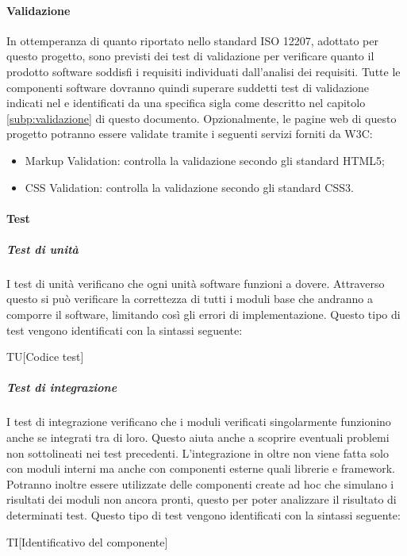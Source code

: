 			\paragraph{Validazione}
			In ottemperanza di quanto riportato nello standard ISO 12207, adottato per questo progetto, sono previsti dei test di validazione per verificare quanto il prodotto software soddisfi i requisiti individuati dall'analisi dei requisiti.
			Tutte le componenti software dovranno quindi superare suddetti test di validazione indicati nel \docNameVersionPdQ e identificati da una specifica sigla come descritto nel capitolo \ref{subp:validazione} di questo documento.			
			Opzionalmente, le pagine web di questo progetto potranno essere validate tramite i seguenti servizi forniti da W3C:
			\begin{itemize}
				\item Markup Validation: controlla la validazione secondo gli standard HTML5;
				\item CSS Validation: controlla la validazione secondo gli standard CSS3.
			\end{itemize}			

			\paragraph{Test} %
			\label{par:test}
				\subparagraph{Test di unità}
				I test di unità verificano che ogni unità software funzioni a dovere. Attraverso questo si può verificare la correttezza di tutti i moduli base che andranno a comporre il software, limitando così gli errori di implementazione. Questo tipo di test vengono identificati con la sintassi seguente:\\
				 \begin{center}
				 	TU[Codice test]
				 \end{center}

				 \subparagraph{Test di integrazione}
				 I test di integrazione verificano che i moduli verificati singolarmente funzionino anche se integrati tra di loro. Questo aiuta anche a scoprire eventuali problemi non sottolineati nei test precedenti. L'integrazione in oltre non viene fatta solo con moduli interni ma anche con componenti esterne quali librerie e framework.\\
				 Potranno inoltre essere utilizzate delle componenti create ad hoc che simulano i risultati dei moduli non ancora pronti, questo per poter analizzare il risultato di determinati test. Questo tipo di test vengono identificati con la sintassi seguente:\\
				 \begin{center}
				 	TI[Identificativo del componente]
				 \end{center}

